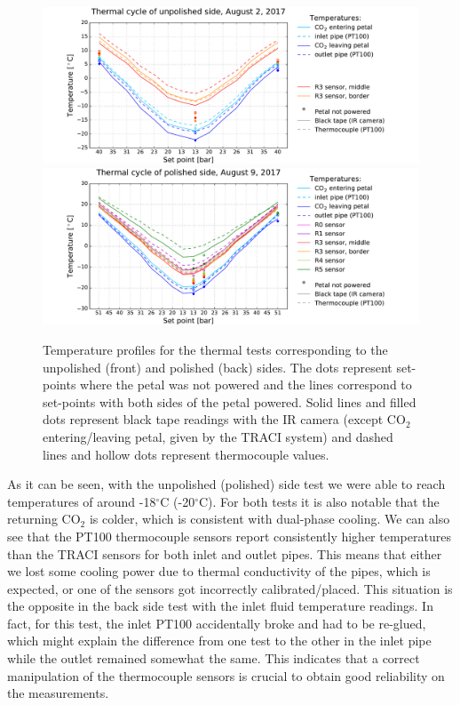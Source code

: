 		\begin{figure}[ht!]
			\centering
			\captionsetup{justification=centering,margin=0cm}
			\includegraphics[scale=0.45]{Figures/Chapter04/unwrapped_cycle_2_201711121522.pdf}
			\includegraphics[scale=0.45]{Figures/Chapter04/unwrapped_cycle_9_201711121522.pdf}
			\caption{Temperature profiles for the thermal tests corresponding to the unpolished (front) and polished (back) sides. The dots represent set-points where the petal was not powered and the lines correspond to set-points with both sides of the petal powered. Solid lines and filled dots represent black tape readings with the IR camera (except CO$_{2}$ entering/leaving petal, given by the TRACI system) and dashed lines and hollow dots represent thermocouple values.}\label{fig4.1}
		\end{figure}
	
		As it can be seen, with the unpolished (polished) side test we were able to reach temperatures of around -18\space$^{\circ}$C (-20\space$^{\circ}$C). For both tests it is also notable that the returning CO$_{2}$ is colder, which is consistent with dual-phase cooling. We can also see that the PT100 thermocouple sensors report consistently higher temperatures than the TRACI sensors for both inlet and outlet pipes. This means that either we lost some cooling power due to thermal conductivity of the pipes, which is expected, or one of the sensors got incorrectly calibrated/placed. This situation is the opposite in the back side test with the inlet fluid temperature readings. In fact, for this test, the inlet PT100 accidentally broke and had to be re-glued, which might explain the difference from one test to the other in the inlet pipe while the outlet remained somewhat the same. This indicates that a correct manipulation of the thermocouple sensors is crucial to obtain good reliability on the measurements.
		
